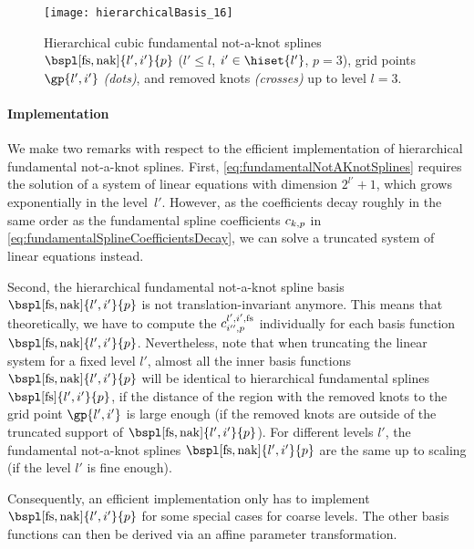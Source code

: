 \begin{SCfigure}
  \texttt{[image: hierarchicalBasis\_16]}%
  \caption[%
    Hierarchical fundamental not-a-knot splines%
  ]{%
    Hierarchical cubic fundamental not-a-knot splines
    $\bspl[\fs,\nak]{l',i'}{p}$
    ($l' \le l$, $i' \in \hiset{l'}$, $p = 3$),
    grid points $\gp{l',i'}$ \emph{(dots)}, and
    removed knots \emph{(crosses)} up to level $l = 3$.%
  }%
  \label{fig:hierarchicalFundamentalNotAKnotSpline}%
\end{SCfigure}

\paragraph{Implementation}

We make two remarks with respect to the efficient implementation
of hierarchical fundamental not-a-knot splines.
First,
\cref{eq:fundamentalNotAKnotSplines} requires the solution of a system
of linear equations with dimension $2^{l'} + 1$,
which grows exponentially in the level~$l'$.
However, as the coefficients decay roughly in the same order
as the fundamental spline coefficients $\fundsplcoeff{k}{p}$ in
\cref{eq:fundamentalSplineCoefficientsDecay},
we can solve a truncated system of linear equations instead.

Second, the hierarchical fundamental not-a-knot spline basis
$\bspl[\fs,\nak]{l',i'}{p}$ is not translation-invariant anymore.
This means that theoretically, we have to compute the
$\fundsplcoeff[l',i',\fs]{i''}{p}$ individually for each basis function
$\bspl[\fs,\nak]{l',i'}{p}$.
Nevertheless, note that
when truncating the linear system for a fixed level $l'$,
almost all the inner basis functions $\bspl[\fs,\nak]{l',i'}{p}$
will be identical to hierarchical fundamental splines
$\bspl[\fs]{l',i'}{p}$, if the distance of the region with the removed knots
to the grid point $\gp{l',i'}$ is large enough
(if the removed knots are outside of the truncated support of
$\bspl[\fs,\nak]{l',i'}{p}$).
For different levels $l'$, the fundamental not-a-knot splines
$\bspl[\fs,\nak]{l',i'}{p}$ are the same up to scaling
(if the level $l'$ is fine enough).

Consequently, an efficient implementation only has to implement
$\bspl[\fs,\nak]{l',i'}{p}$ for some special cases for coarse levels.
The other basis functions can then be derived via an affine
parameter transformation.
